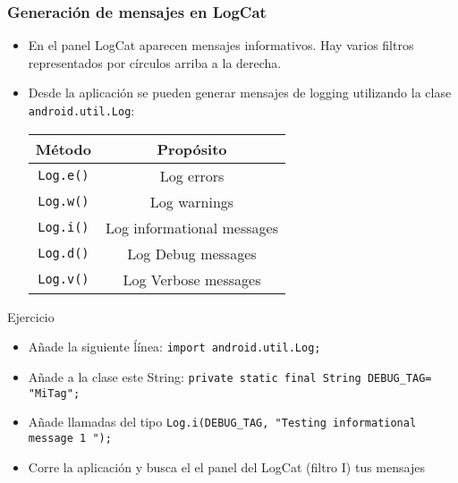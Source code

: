 \documentclass[hyperref={pdfpagelabels=true},utf8x]{beamer}
\begin{document}
\begin{frame}[fragile,shrink=33.83]
\frametitle{Generación de mensajes en LogCat}

\begin{itemize}
\item En el panel LogCat aparecen mensajes informativos. Hay varios filtros representados por círculos arriba a la derecha. 
\item Desde la aplicación se pueden generar mensajes de logging
  utilizando la clase \verb|android.util.Log|:

\begin{tabular}{|c|c|}
\hline
\textbf{Método} &	\textbf{Propósito}\\\hline\hline
\verb|Log.e()|  & Log errors\\\hline
\verb|Log.w()|	& Log warnings\\\hline
\verb|Log.i()|	& Log informational messages\\\hline
\verb|Log.d()|	& Log Debug messages\\\hline
\verb|Log.v()|	& Log Verbose messages\\\hline
\end{tabular}
\end{itemize}

\begin{block}{Ejercicio}
\begin{itemize}
\item Añade la siguiente ĺínea: \verb|import android.util.Log;| 
\item Añade a la clase este String:
  \verb|private static final String DEBUG_TAG= "MiTag";|
\item Añade llamadas del tipo
  \verb|Log.i(DEBUG_TAG, "Testing informational message 1 ");|
\item Corre la aplicación y busca el el panel del LogCat (filtro I) tus mensajes
\end{itemize}
\end{block}

\end{frame}






\end{document}
